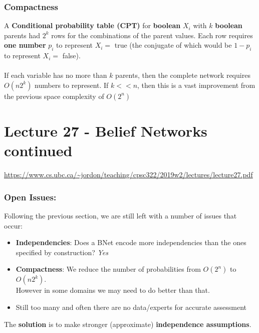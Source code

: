\documentclass{article}
\def\blu#1{{\color{blu}#1}}
\begin{document}
\subsubsection*{Compactness}
A \textbf{Conditional probability table (CPT)} for \textbf{\blu{boolean}} $ X_i $ with $ k $ \textbf{\blu{boolean}} parents had \blu{$ 2^k $} rows for the combinations of the parent values. Each row requires \textbf{one number} $ p_i $ to represent $ X_i =  $ true (the conjugate of which would be $ 1 - p_i $ to represent $ X_i =$ false). \\
\\
If each variable has no more than $ k $ parents, then the complete network requires $ O(n2^k) $ numbers to represent. If $ k << n $, then this is a vast improvement from the previous space complexity of $ O(2^n) $ 
\newpage
\section*{Lecture 27 - Belief Networks continued}
\url{https://www.cs.ubc.ca/~jordon/teaching/cpsc322/2019w2/lectures/lecture27.pdf}
\subsubsection*{Open Issues:}
Following the previous section, we are still left with a number of issues that occur:
\begin{itemize}
	\item \textbf{Independencies}: Does a BNet encode more independencies than the ones specified by construction? \quad \textit{Yes}
	\item \textbf{Compactness}: We reduce the number of probabilities from $ O(2^n) $ to $ O(n2^k) $. \\
	However in some domains we may need to do better than that. 
	\item Still too many and often there are no data/experts for accurate assessment
\end{itemize}
The \textbf{solution} is to make stronger (approximate) \textbf{independence assumptions}. 
\end{document}
